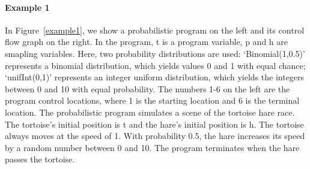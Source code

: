 \documentclass[sigconf,review, anonymous]{acmart}
\begin{document}
\paragraph{Example 1} In Figure~\ref{example1}, we show a probabilistic program on the left and its control flow graph on the right. In the program,  t is a program variable,  p and h are smapling variables. Here, two probability distributions are used: `Binomial(1,0.5)' represents a binomial distribution, which yields values 0 and 1 with equal chance; `unifInt(0,1)' represents an integer uniform distribution, which yields the integers between 0 and 10  with equal probability. The numbers 1-6 on the left are the program control locations, where 1 is the starting location and 6 is the terminal location. The probabilistic program simulates a scene of the tortoise hare race. The tortoise's initial position is t and the hare's initial position is h.  The tortoise  always moves at the speed of 1. With probability 0.5, the hare increases its speed by a random number between 0 and 10. The program terminates when the hare passes the tortoise.
\end{document}

